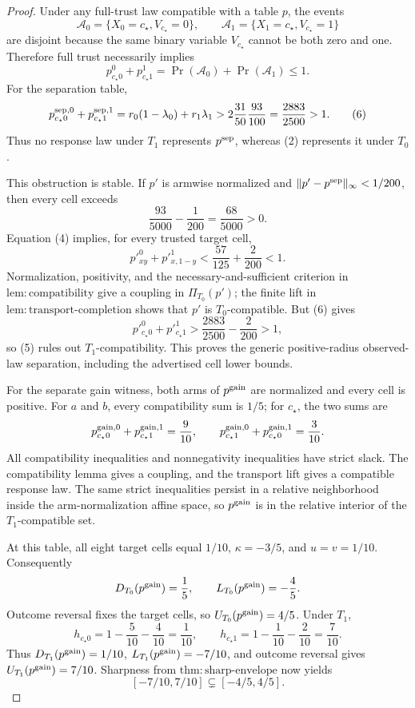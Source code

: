\documentclass{article}
\begin{document}
\begin{proof}
Under any full-trust law compatible with a table \(p\), the events
\[
 \mathcal A_0=\{X_0=c_\star,V_{c_\star}=0\},
 \qquad
 \mathcal A_1=\{X_1=c_\star,V_{c_\star}=1\}
\]
are disjoint because the same binary variable \(V_{c_\star}\) cannot be
both zero and one.  Therefore full trust necessarily implies
\[
 p^0_{c_\star0}+p^1_{c_\star1}
 =\Pr(\mathcal A_0)+\Pr(\mathcal A_1)\le1. \tag{5}
\]
For the separation table,
\[
 p^{{\rm sep},0}_{c_\star0}+p^{{\rm sep},1}_{c_\star1}
 =r_0(1-\lambda_0)+r_1\lambda_1
 >2\frac{31}{50}\frac{93}{100}
 =\frac{2883}{2500}>1. \tag{6}
\]
Thus no response law under \(T_1\) represents \(p^{\rm sep}\), whereas
(2) represents it under \(T_0\).

This obstruction is stable.  If \(p'\) is armwise normalized and
\(\lVert p'-p^{\rm sep}\rVert_\infty<1/200\), then every cell exceeds
\[
 \frac{93}{5000}-\frac1{200}=\frac{68}{5000}>0.
\]
Equation (4) implies, for every trusted target cell,
\[
 p'^0_{xy}+p'^1_{x,1-y}
 <\frac{57}{125}+\frac2{200}<1.
\]
Normalization, positivity, and the necessary-and-sufficient criterion in
\(\mathrm{lem{:}compatibility}\) give a coupling in \(\Pi_{T_0}(p')\);
the finite lift in \(\mathrm{lem{:}transport\mbox{-}completion}\) shows
that \(p'\) is \(T_0\)-compatible.  But (6) gives
\[
 p'^0_{c_\star0}+p'^1_{c_\star1}
 >\frac{2883}{2500}-\frac2{200}>1,
\]
so (5) rules out \(T_1\)-compatibility.  This proves the generic
positive-radius observed-law separation, including the advertised cell
lower bounds.

For the separate gain witness, both arms of \(p^{\rm gain}\) are normalized
and every cell is positive.  For \(a\) and \(b\), every compatibility sum is
\(1/5\); for \(c_\star\), the two sums are
\[
 p^{{\rm gain},0}_{c_\star0}+p^{{\rm gain},1}_{c_\star1}=\frac9{10},
 \qquad
 p^{{\rm gain},0}_{c_\star1}+p^{{\rm gain},1}_{c_\star0}=\frac3{10}.
\]
All compatibility inequalities and nonnegativity inequalities have strict
slack.  The compatibility lemma gives a coupling, and the transport lift
gives a compatible response law.  The same strict inequalities persist in
a relative neighborhood inside the arm-normalization affine space, so
\(p^{\rm gain}\) is in the relative interior of the \(T_1\)-compatible set.

At this table, all eight target cells equal \(1/10\),
\(\kappa=-3/5\), and \(u=v=1/10\).  Consequently
\[
 D_{T_0}(p^{\rm gain})=\frac15,
 \qquad L_{T_0}(p^{\rm gain})=-\frac45.
\]
Outcome reversal fixes the target cells, so \(U_{T_0}(p^{\rm gain})=4/5\).
Under \(T_1\),
\[
 h_{c_\star0}=1-\frac5{10}-\frac4{10}=\frac1{10},
 \qquad
 h_{c_\star1}=1-\frac1{10}-\frac2{10}=\frac7{10}.
\]
Thus \(D_{T_1}(p^{\rm gain})=1/10\),
\(L_{T_1}(p^{\rm gain})=-7/10\), and outcome reversal gives
\(U_{T_1}(p^{\rm gain})=7/10\).  Sharpness from
\(\mathrm{thm{:}sharp\mbox{-}envelope}\) now yields
\[
 [-7/10,7/10]\subsetneq[-4/5,4/5]. \tag{7}
\]


\end{proof}
\end{document}
